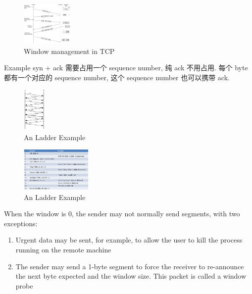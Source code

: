 \begin{figure}[!htb]
    \centering
    \includegraphics[width=0.22\textwidth]{pic/CN6/Window management in TCP}
    \caption{Window management in TCP}
\end{figure}

Example %
syn + ack 需要占用一个 sequence number, 纯 ack 不用占用. 每个 byte 都有一个对应的 sequence number, 这个 sequence number 也可以携带 ack. 

\begin{figure}[!htb]
    \centering
    \includegraphics[width=0.1\textwidth]{pic/CN6/An Ladder Example}
    \caption{An Ladder Example}
\end{figure}

\begin{figure}[!htb]
    \centering
    \includegraphics[width=0.309\textwidth]{pic/CN6/An Ladder Example2}
    \caption{An Ladder Example}
\end{figure}



When the window is 0, the sender may not normally send segments, with two exceptions:
\begin{enumerate}\scriptsize
    \item Urgent data may be sent, for example, to allow the user to
    kill the process running on the remote machine
    \item The sender may send a 1-byte segment to force the receiver
    to re-announce the next byte expected and the window size.
    This packet is called a window probe
\end{enumerate}

